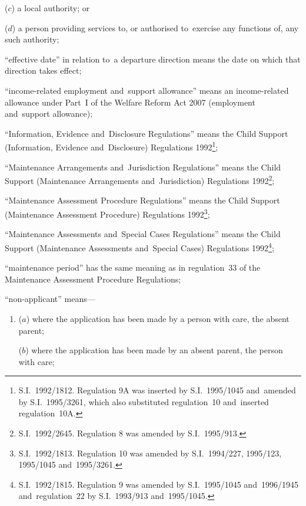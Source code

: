 \documentclass[12pt,a4paper]{article}
\begin{document}
\begin{enumerate}
\begin{enumerate}
    ($c$) 
    a local authority; or

    ($d$) 
    a person providing services to, or authorised to~exercise any functions of, any such authority;
\end{enumerate}

“effective date” in relation to~a departure direction means the date on which
that direction takes effect;

“income-related employment and~support allowance” means an income-related allowance under Part~I of the Welfare Reform Act 2007 (employment and~support allowance);

“Information, Evidence and~Disclosure Regulations” means the Child Support
(Information, Evidence and~Disclosure) Regulations 1992\footnote{\frenchspacing S.I.~1992/1812. Regulation 9A was inserted by S.I.~1995/1045 and~amended by S.I.~1995/3261, which also substituted regulation~10 and~inserted regulation~10A.};

“Maintenance Arrangements and~Jurisdiction Regulations” means the Child Support
(Maintenance Arrangements and~Jurisdiction) Regulations 1992\footnote{\frenchspacing S.I.~1992/2645. Regulation 8 was amended by S.I.~1995/913.};

“Maintenance Assessment Procedure Regulations” means the Child Support
(Maintenance Assessment Procedure) Regulations 1992\footnote{\frenchspacing S.I.~1992/1813. Regulation 10 was amended by S.I.~1994/227, 1995/123, 1995/1045 and~1995/3261.};

“Maintenance Assessments and~Special Cases Regulations” means the Child Support
(Maintenance Assessments and~Special Cases) Regulations 1992\footnote{\frenchspacing S.I.~1992/1815. Regulation 9 was amended by S.I.~1995/1045 and~1996/1945 and~regulation~22 by S.I.~1993/913 and~1995/1045.};

“maintenance period” has the same meaning as in regulation~33 of the Maintenance
Assessment Procedure Regulations;

“non-applicant” means—
\begin{enumerate}\item[]
($a$) where the application has been made by a person with care, the absent parent;

($b$) where the application has been made by an absent parent, the person with
care;
\end{enumerate}



\end{enumerate}
\end{document}
